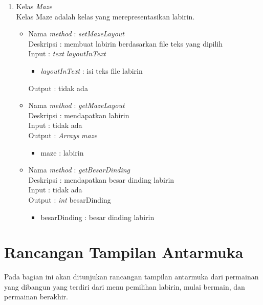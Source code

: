 \begin{enumerate}
	\item Kelas \textit{Maze}\\
	Kelas Maze adalah kelas yang merepresentasikan labirin.
	
		\begin{itemize}
			\item Nama \textit{method} : \textit{setMazeLayout}\\
				  Deskripsi : membuat labirin berdasarkan file teks yang dipilih\\
				  Input : \textit{text layoutInText }
				  	\begin{itemize}
				  		\item \textit{layoutInText} : isi teks file labirin
				  	\end{itemize}
				  Output : tidak ada\\
		\end{itemize}
		
		\begin{itemize}
			\item Nama \textit{method} : \textit{getMazeLayout}\\
				  Deskripsi : mendapatkan labirin \\
				  Input : tidak ada\\
				  Output : \textit{Arrays} \textit{maze}
				  	\begin{itemize}
				  		\item maze : labirin 
				  	\end{itemize}
		\end{itemize}
		
		\begin{itemize}
			\item Nama \textit{method} : \textit{getBesarDinding}\\
				  Deskripsi : mendapatkan besar dinding labirin \\
				  Input : tidak ada\\
				  Output : \textit{int} besarDinding
				  	\begin{itemize}
				  		\item besarDinding : besar dinding labirin
				  	\end{itemize}
		\end{itemize}
\end{enumerate} 

\section{Rancangan Tampilan Antarmuka}
Pada bagian ini akan ditunjukan rancangan tampilan antarmuka dari permainan yang dibangun yang terdiri dari menu pemilihan labirin, mulai bermain, dan permainan berakhir.

